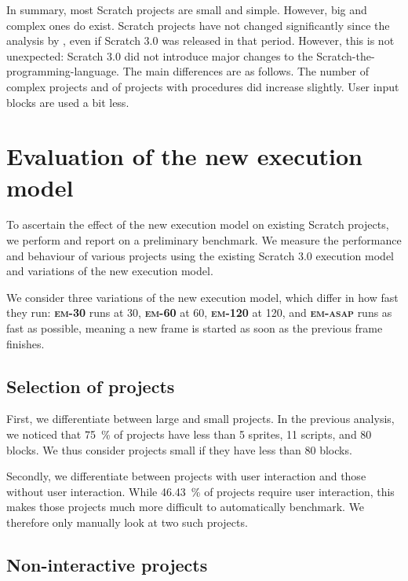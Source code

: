 \documentclass[../main]{subfiles}
\begin{document}
In summary, most Scratch projects are small and simple.
However, big and complex ones do exist.
Scratch projects have not changed significantly since the analysis by \textcite{aivaloglouHowKidsCode2016}, even if Scratch 3.0 was released in that period.
However, this is not unexpected: Scratch 3.0 did not introduce major changes to the Scratch-the-programming-language.
The main differences are as follows.
The number of complex projects and of projects with procedures did increase slightly.
User input blocks are used a bit less.

\section{Evaluation of the new execution model}\label{sec:evaluation-of-the-new-execution-model}

To ascertain the effect of the new execution model on existing Scratch projects, we perform and report on a preliminary benchmark.
We measure the performance and behaviour of various projects using the existing Scratch 3.0 execution model and variations of the new execution model.

We consider three variations of the new execution model, which differ in how fast they run: \textbf{\textsc{em-30}} runs at \qty{30}{\fps}, \textbf{\textsc{em-60}} at \qty{60}{\fps}, \textbf{\textsc{em-120}} at \qty{120}{\fps}, and \textbf{\textsc{em-asap}} runs as fast as possible, meaning a new frame is started as soon as the previous frame finishes.

\subsection{Selection of projects}\label{subsec:selection-of-projects}

First, we differentiate between large and small projects.
In the previous analysis, we noticed that \qty{75}{\percent} of projects have less than 5 sprites, 11 scripts, and 80 blocks.
We thus consider projects small if they have less than 80 blocks.

Secondly, we differentiate between projects with user interaction and those without user interaction.
While \qty{46.43}{\percent} of projects require user interaction, this makes those projects much more difficult to automatically benchmark.
We therefore only manually look at two such projects.

\subsection{Non-interactive projects}\label{subsec:non-interactive-projects}
\end{document}
